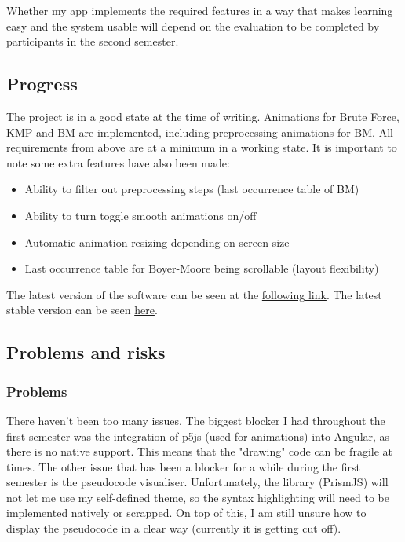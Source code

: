 \documentclass[11pt]{article}
\providecommand{\tightlist}{%
  \setlength{\itemsep}{0pt}\setlength{\parskip}{0pt}}
\begin{document}
Whether my app implements the required features in a way that makes learning easy and the system usable will depend on the evaluation to be completed by participants in the second semester.

\subsection{Progress}\label{progress}

The project is in a good state at the time of writing. Animations for Brute Force, KMP and BM are implemented, including preprocessing animations for BM. All requirements from above are at a minimum in a working state. It is important to note some extra features have also been made:
\begin{itemize}
    \tightlist
\item Ability to filter out preprocessing steps (last occurrence table of BM)
\item Ability to turn toggle smooth animations on/off
\item Automatic animation resizing depending on screen size
\item Last occurrence table for Boyer-Moore being scrollable (layout flexibility)
\end{itemize}

The latest version of the software can be seen at the \href{https://string-search-visualiser-prod.netlify.app/}{following link}. The latest stable version can be seen \href{https://string-search-visualiser-staging.netlify.app/algorithm-visualiser/bruteForce}{here}.

\subsection{Problems and risks}\label{problems-and-risks}

\subsubsection{Problems}\label{problems}

There haven't been too many issues. The biggest blocker I had throughout the first semester was the integration of p5js (used for animations) into Angular, as there is no native support. This means that the "drawing" code can be fragile at times. The other issue that has been a blocker for a while during the first semester is the pseudocode visualiser. Unfortunately, the library (PrismJS) will not let me use my self-defined theme, so the syntax highlighting will need to be implemented natively or scrapped. On top of this, I am still unsure how to display the pseudocode in a clear way (currently it is getting cut off).
\end{document}
